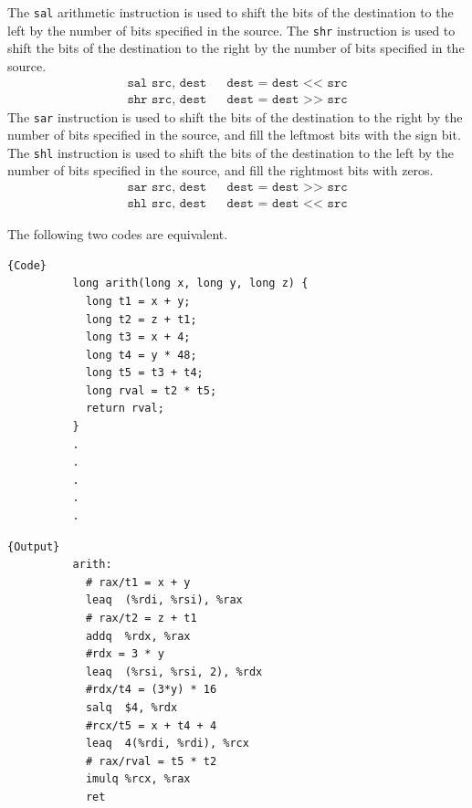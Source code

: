 \documentclass{article}
\begin{document}
      \begin{definition}
        The \texttt{sal} arithmetic instruction is used to shift the bits of the destination to the left by the number of bits specified in the source. The \texttt{shr} instruction is used to shift the bits of the destination to the right by the number of bits specified in the source.
        \begin{align*}
          \texttt{sal src, dest} && \texttt{dest = dest << src}  \\
          \texttt{shr src, dest} && \texttt{dest = dest >> src}
        \end{align*}
        The \texttt{sar} instruction is used to shift the bits of the destination to the right by the number of bits specified in the source, and fill the leftmost bits with the sign bit. The \texttt{shl} instruction is used to shift the bits of the destination to the left by the number of bits specified in the source, and fill the rightmost bits with zeros. 
        \begin{align*}
          \texttt{sar src, dest} && \texttt{dest = dest >> src}  \\
          \texttt{shl src, dest} && \texttt{dest = dest << src}
        \end{align*}
      \end{definition}

      \begin{example}
        The following two codes are equivalent. 

        \noindent\begin{minipage}{.5\textwidth}
        \begin{lstlisting}[]{Code}
          long arith(long x, long y, long z) {
            long t1 = x + y; 
            long t2 = z + t1; 
            long t3 = x + 4; 
            long t4 = y * 48; 
            long t5 = t3 + t4;
            long rval = t2 * t5; 
            return rval; 
          }
          .
          .
          .
          .
          .
        \end{lstlisting}
        \end{minipage}
        \hfill
        \begin{minipage}{.49\textwidth}
        \begin{lstlisting}[]{Output}
          arith: 
            # rax/t1 = x + y
            leaq  (%rdi, %rsi), %rax
            # rax/t2 = z + t1
            addq  %rdx, %rax
            #rdx = 3 * y 
            leaq  (%rsi, %rsi, 2), %rdx
            #rdx/t4 = (3*y) * 16
            salq  $4, %rdx 
            #rcx/t5 = x + t4 + 4
            leaq  4(%rdi, %rdi), %rcx 
            # rax/rval = t5 * t2
            imulq %rcx, %rax 
            ret 
        \end{lstlisting}
        \end{minipage}
      \end{example}
  
\end{document}

